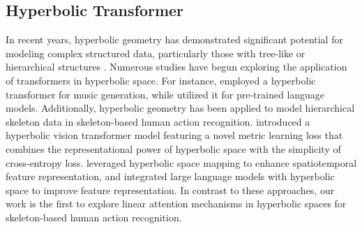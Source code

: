 \subsection{Hyperbolic Transformer}
In recent years, hyperbolic geometry has demonstrated significant potential for modeling complex structured data, particularly those with tree-like or hierarchical structures \citep{yang2024hypformer}. Numerous studies have begun exploring the application of transformers in hyperbolic space. For instance,  \citep{huang2023hyperbolic} employed a hyperbolic transformer for music generation, while  \citep{chen2024hyperbolic} utilized it for pre-trained language models. Additionally, hyperbolic geometry has been applied to model hierarchical skeleton data in skeleton-based human action recognition.  \citep{ermolov2022hyperbolic} introduced a hyperbolic vision transformer model featuring a novel metric learning loss that combines the representational power of hyperbolic space with the simplicity of cross-entropy loss.  \citep{chen2022hmanet} leveraged hyperbolic space mapping to enhance spatiotemporal feature representation, and  \citep{qu2024llms} integrated large language models with hyperbolic space to improve feature representation. In contrast to these approaches, our work is the first to explore linear attention mechanisms in hyperbolic spaces for skeleton-based human action recognition.
